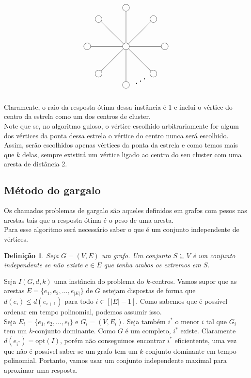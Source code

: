 \documentclass[12pt]{article}
\newcommand{\opt}{\ensuremath{\mathrm{opt}}}
\newtheorem{definition}[theorem]{Definição}
\begin{document}
    \[
    \begin{tikzpicture}
        \def\n{8}
        
        \def\r{2cm}
        
        \def\rotationangle{90}
        
        \draw (0,0) node[circle, draw, minimum size=10pt, inner sep=1.5pt] (center) {};
        
        \begin{scope}[rotate=\rotationangle]
          \foreach \i in {1,...,\n} {
            \draw (\i*360/\n:\r) node[circle, draw, minimum size=10pt, inner sep=1.5pt] (\i) {};
          }
        \end{scope}
        
        \foreach \i in {1,...,\n} {
          \draw (center) -- (\i);
        }
        \draw (4) node[shift={(0.75,0.2)}] {\rotatebox{30}{\scalebox{1.5}{$\ldots$}}} (4);
      \end{tikzpicture}
      \] \\
      Claramente, o raio da resposta ótima dessa instância é 1 e inclui o vértice do centro da estrela como um dos centros de cluster. \\
      Note que se, no algoritmo guloso, o vértice escolhido arbitrariamente for algum dos vértices da ponta dessa estrela o vértice do centro nunca será escolhido. Assim, serão escolhidos apenas vértices da ponta da estrela e como temos mais que $k$ delas, sempre existirá um vértice ligado ao centro do seu cluster com uma aresta de distância 2.
\newpage
\subsection{Método do gargalo}
Os chamados problemas de gargalo são aqueles definidos em grafos com pesos nas arestas tais que a resposta ótima é o peso de uma aresta. \\
Para esse algoritmo será necessário saber o que é um conjunto independente de vértices.
\begin{definition}
    Seja $G = (V,E)$ um grafo. Um conjunto $S \subseteq V$ é um conjunto \emph{independente} se não existe $e \in E$ que tenha ambos os extremos em $S$.
\end{definition}
Seja $I(G,d,k)$ uma instância do problema do $k$-centros. Vamos supor que as arestas $E = \{e_1,e_2,\ldots,e_{|E|}\}$ de $G$ estejam dispostas de forma que $d(e_i) \leq d(e_{i+1})$ para todo $i \in [|E|-1]$. Como sabemos que é possível ordenar em tempo polinomial, podemos assumir isso. \\
Seja $E_i = \{e_1,e_2,\ldots,e_i\}$ e $G_i = (V,E_i)$. Seja também $i^*$ o menor $i$ tal que $G_i$ tem um $k$-conjunto dominante. Como $G$ é um completo, $i^*$ existe. Claramente $d(e_{i^*}) = \opt(I)$, porém não conseguimos encontrar $i^*$ eficientente, uma vez que não é possível saber se um grafo tem um $k$-conjunto dominante em tempo polinomial. Portanto, vamos usar um conjunto independente maximal para aproximar uma resposta.
\end{document}
